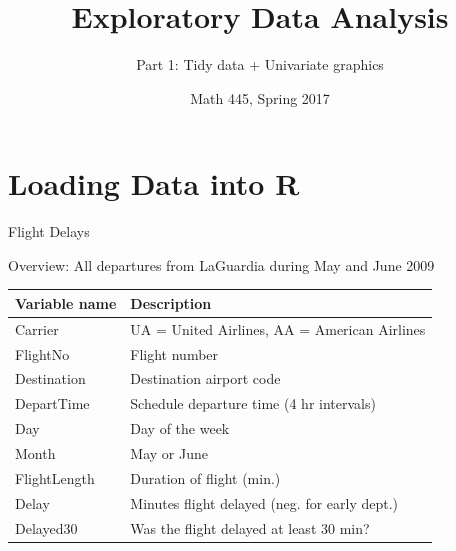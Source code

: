 \documentclass[10pt]{beamer}\usepackage[]{graphicx}\usepackage[]{color}
\title{Exploratory Data Analysis}
\subtitle{Part 1: Tidy data + Univariate graphics}
\date{}
\author{Math 445, Spring 2017}
\begin{document}
\maketitle


\section{Loading Data into R}


\begin{frame}[fragile]{Flight Delays}

Overview: All departures from LaGuardia during May and June 2009

\bigskip

\begin{tabular}{l l} \hline
Variable name & Description\\ \hline
Carrier     & UA = United Airlines, AA = American Airlines\\
FlightNo    & Flight number\\
Destination & Destination airport code\\
DepartTime  & Schedule departure time (4 hr intervals)\\
Day         & Day of the week\\
Month       & May or June\\
FlightLength & Duration of flight (min.)\\
Delay       & Minutes flight delayed (neg. for early dept.)\\
Delayed30   & Was the flight delayed at least 30 min?\\
\hline
\end{tabular}
\end{frame}

\end{document}
